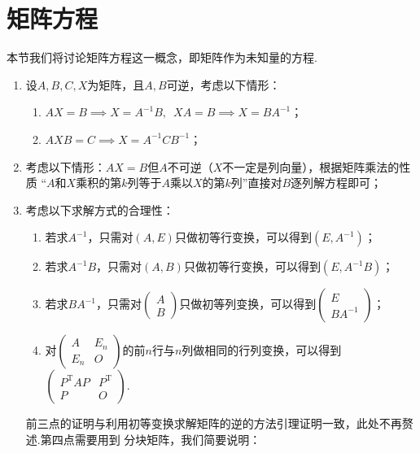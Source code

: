 \section{矩阵方程}
本节我们将讨论矩阵方程这一概念，即矩阵作为未知量的方程.
\begin{enumerate}
    \item 设$A,B,C,X$为矩阵，且$A,B$可逆，考虑以下情形：
    \begin{enumerate}[label=(\arabic*)]
        \item $AX=B \implies X=A^{-1}B, \enspace XA=B \implies X=BA^{-1}$；
        \item $AXB=C \implies X=A^{-1}CB^{-1}$；
    \end{enumerate}
    \item 考虑以下情形：$AX=B$但$A$不可逆（$X$不一定是列向量），根据矩阵乘法的性质
    ``$A$和$X$乘积的第$k$列等于$A$乘以$X$的第$k$列''直接对$B$逐列解方程即可；
    \item 考虑以下求解方式的合理性：
    \begin{enumerate}[label=(\arabic*)]
        \item 若求$A^{-1}$，只需对$(A,E)$只做初等行变换，可以得到$(E,A^{-1})$；
        \item 若求$A^{-1}B$，只需对$(A,B)$只做初等行变换，可以得到$(E,A^{-1}B)$；
        \item 若求$BA^{-1}$，只需对$\begin{pmatrix}
            A \\ B
        \end{pmatrix}$只做初等列变换，可以得到$\begin{pmatrix}
            E \\ BA^{-1}
        \end{pmatrix}$；
        \item 对$\begin{pmatrix}
            A & E_n \\ E_n & O
        \end{pmatrix}$的前$n$行与$n$列做相同的行列变换，可以得到$\begin{pmatrix}
            P^\mathrm{T}AP & P^\mathrm{T} \\ P & O
        \end{pmatrix}$.
    \end{enumerate}
    前三点的证明与利用初等变换求解矩阵的逆的方法引理证明一致，此处不再赘述.第四点需要用到
    分块矩阵，我们简要说明：
    

\end{enumerate}
